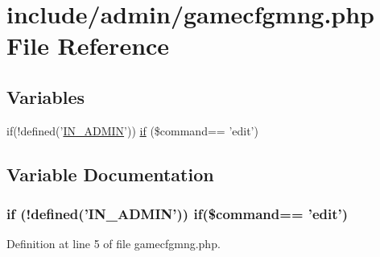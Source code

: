 \hypertarget{gamecfgmng_8php}{\section{include/admin/gamecfgmng.php File Reference}
\label{gamecfgmng_8php}
}
\subsection*{Variables}
\begin{DoxyCompactItemize}
\item 
if(!defined('\hyperlink{admin_8php_ad49472b0cdee543164375bf133a537f1}{I\+N\+\_\+\+A\+D\+M\+I\+N}')) \hyperlink{gamecfgmng_8php_a41131cc70f5c0a1daedef8f452198595}{if} (\$command== 'edit')
\end{DoxyCompactItemize}


\subsection{Variable Documentation}
\hypertarget{gamecfgmng_8php_a41131cc70f5c0a1daedef8f452198595}{
\subsubsection[{if}]{\setlength{\rightskip}{0pt plus 5cm}if (!defined('{\bf I\+N\+\_\+\+A\+D\+M\+I\+N}')) if(\$command== 'edit')}}\label{gamecfgmng_8php_a41131cc70f5c0a1daedef8f452198595}


Definition at line 5 of file gamecfgmng.\+php.

